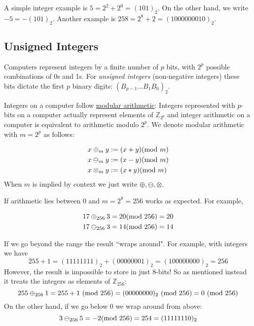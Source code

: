 \begin{example} A simple integer example is $5 = 2^2 + 2^0 = (101)_2$. On the other hand, we write $-5 = -(101)_2$. Another example is $258 = 2^8 + 2 = (1000000010)_2$. \end{example}

\subsection{Unsigned Integers}
Computers represent integers by a finite number of $p$ bits, with $2^p$ possible combinations of 0s and 1s. For \emph{unsigned integers} (non-negative integers)  these bits dictate the first $p$ binary digits: $(B_{p-1}\ldots B_1B_0)_2$. 

Integers on a computer follow \href{https://en.wikipedia.org/wiki/Modular_arithmetic}{modular arithmetic}: Integers represented with $p$-bits on a computer actually  represent elements of ${\mathbb Z}_{2^p}$ and integer arithmetic on a computer is  equivalent to arithmetic modulo $2^p$. We denote modular arithmetic with $m = 2^p$ as follows:


\begin{align*}
x \ensuremath{\oplus}_m y &:= (x+y) ({\rm mod}\ m) \\
x \ensuremath{\ominus}_m y &:= (x-y) ({\rm mod}\ m) \\
x \ensuremath{\otimes}_m y &:= (x*y) ({\rm mod}\ m)
\end{align*}
When $m$ is implied by context we just write $\ensuremath{\oplus}, \ensuremath{\ominus}, \ensuremath{\otimes}$.

\begin{example}  If  arithmetic lies between $0$ and $m = 2^8 = 256$ works as expected.  For example,


\begin{align*}
17 \ensuremath{\oplus}_{256} 3 = 20 ({\rm mod}\ 256) = 20 \\
17 \ensuremath{\ominus}_{256} 3 = 14 ({\rm mod}\ 256) = 14
\end{align*}
\end{example}

\begin{example} If we go beyond the range the result ``wraps around". For example, with integers we have
\[
255 + 1 = (11111111)_2 + (00000001)_2 = (100000000)_2 = 256
\]
However, the result is impossible to store in just 8-bits!  So as mentioned instead it treats the integers as elements of ${\mathbb Z}_{256}$:
\[
255 \ensuremath{\oplus}_{256} 1 = 255 + 1 \ ({\rm mod}\ 256) = (00000000)_2 \ ({\rm mod}\ 256) = 0 \ ({\rm mod}\ 256)
\]
On the other hand, if we go below $0$ we wrap around from above:
\[
3 \ensuremath{\ominus}_{256} 5 = -2 ({\rm mod}\ 256) = 254 = (11111110)_2
\]
\end{example}

